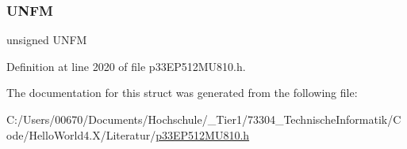 \subsubsection{\texorpdfstring{U\+N\+FM}{UNFM}}
{\footnotesize\ttfamily unsigned U\+N\+FM}



Definition at line 2020 of file p33\+E\+P512\+M\+U810.\+h.



The documentation for this struct was generated from the following file\+:\begin{DoxyCompactItemize}
\item 
C\+:/\+Users/00670/\+Documents/\+Hochschule/\+\_\+\+Tier1/73304\+\_\+\+Technische\+Informatik/\+Code/\+Hello\+World4.\+X/\+Literatur/\hyperlink{p33_e_p512_m_u810_8h}{p33\+E\+P512\+M\+U810.\+h}\end{DoxyCompactItemize}
